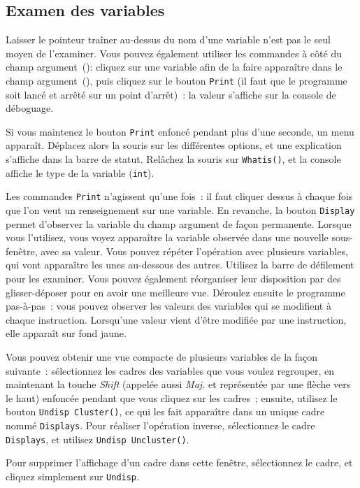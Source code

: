 \documentclass[12pt,a4paper]{article}
\begin{document}
\subsection{Examen des variables}


Laisser le pointeur traîner au-dessus du nom d'une variable n'est pas
le seul moyen de l'examiner. Vous pouvez également utiliser les
commandes à côté du champ argument~(): cliquez sur une variable afin de
la faire apparaître dans le champ argument~(), puis cliquez sur le
bouton {\tt Print} (il faut que le programme soit lancé et arrêté sur
un point d'arrêt)~: la valeur s'affiche sur la console de déboguage.

Si vous maintenez le bouton {\tt Print} enfoncé pendant plus d'une
seconde, un menu apparaît. Déplacez alors la souris sur les
différentes options, et une explication s'affiche dans la barre de
statut. Relâchez la souris sur {\tt Whatis()}, et la console affiche
le type de la variable ({\tt int}).

Les commandes {\tt Print} n'agissent qu'une fois~: il faut cliquer
dessus à chaque fois que l'on veut un renseignement sur une
variable. En revanche, la bouton {\tt Display}
permet d'observer la variable du champ argument de façon
permanente. Lorsque vous l'utilisez, vous voyez apparaître la variable
observée dans une nouvelle sous-fenêtre, avec sa valeur. Vous pouvez
répéter l'opération avec plusieurs variables, qui vont apparaître les
unes au-dessous des autres. Utilisez la barre de défilement pour les
examiner. Vous pouvez également réorganiser leur disposition par des
glisser-déposer pour en avoir une meilleure vue. Déroulez ensuite le
programme pas-à-pas~: vous pouvez observer les valeurs des variables
qui se modifient à chaque instruction. Lorsqu'une valeur vient
d'être modifiée par une instruction, elle apparaît sur fond jaune.


Vous pouvez obtenir une vue compacte de plusieurs variables de la
façon suivante~: sélectionnez les cadres des variables que vous voulez
regrouper, en maintenant la touche \textit{Shift} (appelée aussi
\textit{Maj.} et représentée par une flèche vers le haut) enfoncée
pendant que
vous cliquez sur les cadres~; ensuite, utilisez le bouton {\tt Undisp
  \puis Cluster()}, ce qui les fait apparaître dans un unique cadre
nommé {\tt Displays}. Pour réaliser l'opération inverse, sélectionnez
le cadre {\tt Displays}, et utilisez {\tt Undisp \puis Uncluster()}.

Pour supprimer l'affichage d'un cadre dans cette fenêtre,
sélectionnez le cadre, et cliquez simplement sur {\tt Undisp}.
\end{document}
